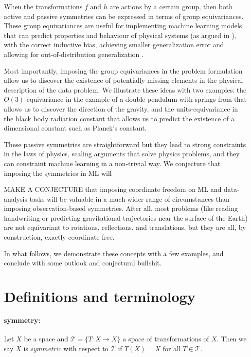 \documentclass{article}
\begin{document}
When the transformations $f$ and $h$ are actions by a certain group, then both active and passive symmetries can be expressed in terms of group equivariances. These group equivariances are useful for implementing machine learning models that can predict properties and behaviour of physical systems (as argued in \cite{cheng2019covariance}), with the correct inductive bias, achieving smaller generalization error \cite{bietti2021sample, elesedy2021provably, elesedy2021kernel, mei2021learning} and allowing for out-of-distribution generalization \cite{villar2022dimensionless}. 

Most importantly, imposing the group equivariances in the problem formulation allow us to discover the existence of potentially missing elements in the physical description of the data problem. We illustrate these ideas with two examples: the $O(3)$-equivariance in the example of a double pendulum with springs from \cite{finzi2021practical, yao2021simple} that allows us to discover the direction of the gravity, and the units-equivariance in the black body radiation constant that allows us to predict the existence of a dimensional constant such as Planck's constant.

These passive symmetries are straightforward but they lead to strong constraints in the laws of physics, scaling arguments that solve physics problems, and they can constraint machine learning in a non-trivial way. We conjecture that imposing the symmetries in ML will 

MAKE A CONJECTURE that imposing coordinate freedom on ML and data-analysis tasks will be valuable in a much wider range of circumstances than imposing observation-based symmetries. After all, most problems (like reading handwriting or predicting gravitational trajectories near the surface of the Earth) are not equivariant to rotations, reflections, and translations, but they are all, by construction, exactly coordinate free.

In what follows, we demonstrate these concepts with a few examples, and conclude with some outlook and conjectural bullshit.

\section{Definitions and terminology}

\paragraph{symmetry:} Let $X$ be a space and $\mathcal T= \{ T:X\to X \}$ a space of transformations of $X$. Then we say $X$ is \emph{symmetric} with respect to $\mathcal T$ if $T(X)=X$ for all $T\in \mathcal T$.   
\end{document}
